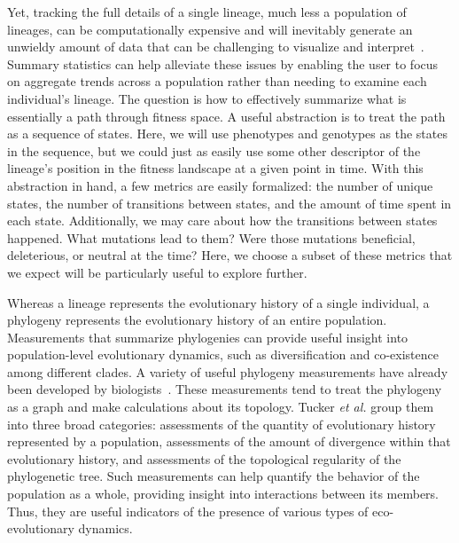 \documentclass[letterpaper]{article}
\begin{document}
Yet, tracking the full details of a single lineage, much less a population of lineages, can be computationally expensive and will inevitably generate an unwieldy amount of data that can be challenging to visualize and interpret~\citep{mcphee_visualizing_2016}.
Summary statistics can help alleviate these issues by enabling the user to focus on aggregate trends across a population rather than needing to examine each individual's lineage. The question is how to effectively summarize what is essentially a path through fitness space. A useful abstraction is to treat the path as a sequence of states. Here, we will use phenotypes and genotypes as the states in the sequence, but we could just as easily use some other descriptor of the lineage's position in the fitness landscape at a given point in time.
With this abstraction in hand, a few metrics are easily formalized: the number of unique states, the number of transitions between states, and the amount of time spent in each state. 
Additionally, we may care about how the transitions between states happened. What mutations lead to them? Were those mutations beneficial, deleterious, or neutral at the time? Here, we choose a subset of these metrics that we expect will be particularly useful to explore further.

Whereas a lineage represents the evolutionary history of a single individual, a phylogeny represents the evolutionary history of an entire population. Measurements that summarize phylogenies can provide useful insight into population-level evolutionary dynamics, such as diversification and co-existence among different clades. A variety of useful phylogeny measurements have already been developed by biologists~\citep{tucker_guide_2017}. These measurements tend to treat the phylogeny as a graph and make calculations about its topology. Tucker \textit{et al.} group them into three broad categories: assessments of the quantity of evolutionary history represented by a population, assessments of the amount of divergence within that evolutionary history, and assessments of the topological regularity of the phylogenetic tree. Such measurements can help quantify the behavior of the population as a whole, providing insight into interactions between its members. Thus, they are useful indicators of the presence of various types of eco-evolutionary dynamics.
\end{document}
